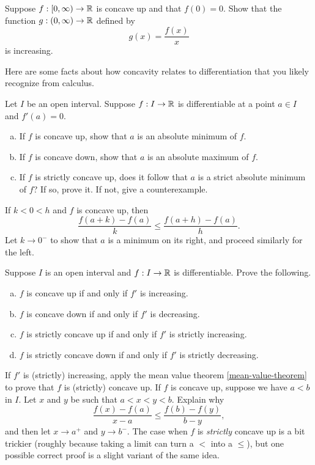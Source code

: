 \begin{exercise}
	Suppose $f : [0, \infty) \to \mathbb{R}$ is concave up and that $f(0) = 0$. Show that the function $g : (0, \infty) \to \mathbb{R}$ defined by 
	\[ g(x) = \frac{f(x)}{x} \]
	is increasing. 
\end{exercise}

Here are some facts about how concavity relates to differentiation that you likely recognize from calculus. 

\begin{exercise} \label{concavity-extremums}
	Let $I$ be an open interval. Suppose $f : I \to \mathbb{R}$ is differentiable at a point $a \in I$ and $f'(a) = 0$. 
	\begin{enumerate}[(a)]
		\item If $f$ is concave up, show that $a$ is an absolute minimum of $f$. 
		\item If $f$ is concave down, show that $a$ is an absolute maximum of $f$. 
		\item If $f$ is strictly concave up, does it follow that $a$ is a strict absolute minimum of $f$? If so, prove it. If not, give a counterexample. 
	\end{enumerate} 
	\begin{hint}
		If $k < 0 < h$ and $f$ is concave up, then
		\[ \frac{f(a+k) - f(a)}{k} \leq \frac{f(a+h)-f(a)}{h}. \]
		Let $k \to 0^-$ to show that $a$ is a minimum on its right, and proceed similarly for the left. 
	\end{hint}
\end{exercise}

\begin{exercise} \label{concavity-derivative}
	Suppose $I$ is an open interval and $f : I \to \mathbb{R}$ is differentiable. Prove the following. 
	\begin{enumerate}[(a)]
		\item $f$ is concave up if and only if $f'$ is increasing. 
		\item $f$ is concave down if and only if $f'$ is decreasing. 
		\item $f$ is strictly concave up if and only if $f'$ is strictly increasing. 
		\item $f$ is strictly concave down if and only if $f'$ is strictly decreasing. 
	\end{enumerate}
	\begin{hint}
		If $f'$ is (strictly) increasing, apply the mean value theorem \ref{mean-value-theorem} to prove that $f$ is (strictly) concave up. If $f$ is concave up, suppose we have $a < b$ in $I$. Let $x$ and $y$ be such that $a < x < y < b$. Explain why 
		\[ \frac{f(x)-f(a)}{x-a} \leq \frac{f(b)-f(y)}{b-y}, \]
		and then let $x \to a^+$ and $y \to b^-$. 
		The case when $f$ is \emph{strictly} concave up is a bit trickier (roughly because taking a limit can turn a $<$ into a  $\leq$), but one possible correct proof is a slight variant of the same idea. 
	\end{hint}
\end{exercise}

